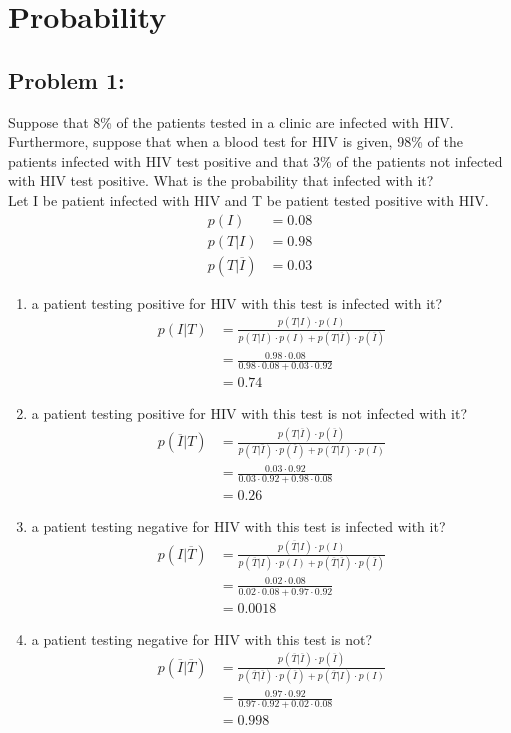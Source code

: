 \documentclass[a4paper]{article}
\begin{document}
	\section*{Probability}
	\subsection*{Problem 1:}
	Suppose that 8\% of the patients tested in a clinic are infected with HIV. Furthermore, suppose that when a blood test for HIV is given, 98\% of the patients infected with HIV test positive and that 3\% of the patients not infected with HIV test positive. What is the probability that infected with it? \\
	
	Let	I be patient infected with HIV and T be patient tested positive with HIV.
	\begin{align*}
	p(I) &= 0.08 \\
	p(T|I) &= 0.98 \\
	p(T|\overline{I}) &= 0.03
	\end{align*}
	\begin{enumerate}
		\item a patient testing positive for HIV with this test is infected with it?
		\begin{align*}
		p(I|T) &= \frac{p(T|I) \cdot p(I)}{p(T|I) \cdot p(I) + p(T|\overline{I}) \cdot p(\overline{I})} \\
		&= \frac{0.98 \cdot 0.08}{0.98 \cdot 0.08 + 0.03 \cdot 0.92} \\
		&= 0.74
		\end{align*}
		\item a patient testing positive for HIV with this test is not infected with it?
		\begin{align*}
		p(\overline{I}|T) &= \frac{p(T|\overline{I}) \cdot p(\overline{I})}{p(T|\overline{I}) \cdot p(\overline{I}) + p(T|I) \cdot p(I)} \\
		&= \frac{0.03 \cdot 0.92}{0.03 \cdot 0.92 + 0.98 \cdot 0.08} \\
		&= 0.26
		\end{align*}
		\item a patient testing negative for HIV with this test is infected with it?
		\begin{align*}
		p(I|\overline{T}) &= \frac{p(\overline{T}|I) \cdot p(I)}{p(\overline{T}|I) \cdot p(I) + p(\overline{T}|\overline{I}) \cdot p(\overline{I})} \\
		&= \frac{0.02 \cdot 0.08}{0.02 \cdot 0.08 + 0.97 \cdot 0.92} \\
		&= 0.0018
		\end{align*}
		\item a patient testing negative for HIV with this test is not?
		\begin{align*}
		p(\overline{I}|\overline{T}) &= \frac{p(\overline{T}|\overline{I}) \cdot p(\overline{I})}{p(\overline{T}|\overline{I}) \cdot p(\overline{I}) + p(\overline{T}|I) \cdot p(I)} \\
		&= \frac{0.97 \cdot 0.92}{0.97 \cdot 0.92 + 0.02 \cdot 0.08} \\
		&= 0.998
		\end{align*}
	\end{enumerate}
	
\end{document}
